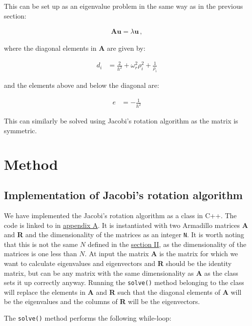 \documentclass[reprint,english,notitlepage]{revtex4-1}  %
\begin{document}
This can be set up as an eigenvalue problem in the same way as in the previous section:

\begin{align*}
\textbf{Au} = \lambda \textbf{u} \, ,
\end{align*}

where the diagonal elements in \textbf{A} are given by:

\begin{align*}
d_i &= \frac{2}{h^2} + \omega_r^2 \rho_i^2 + \frac{1}{\rho_i}
\end{align*}

and the elements above and below the diagonal are:

\begin{align*}
e &= - \frac{1}{h^2}
\end{align*}

This can similarly be solved using Jacobi's rotation algorithm as the matrix is symmetric.

\newpage


\section{Method} \label{sec:III}

\subsection{Implementation of Jacobi's rotation algorithm} \label{sec:III:a}

We have implemented the Jacobi's rotation algorithm as a class in C++. The code is linked to in \hyperref[A]{appendix A}. It is instantiated with two Armadillo \citep{Armadillo} matrices \textbf{A} and \textbf{R} and the dimensionality of the matrices as an integer \verb+N+. It is worth noting that this is not the same $N$ defined in the \hyperref[sec:II]{section II}, as the dimensionality of the matrices is one less than $N$. At input the matrix \textbf{A} is the matrix for which we want to calculate eigenvalues and eigenvectors and \textbf{R} should be the identity matrix, but can be any matrix with the same dimensionality as \textbf{A} as the class sets it up correctly anyway. Running the \verb+solve()+ method belonging to the class will replace the elements in \textbf{A} and \textbf{R} such that the diagonal elements of \textbf{A} will be the eigenvalues and the columns of \textbf{R} will be the eigenvectors.

The \verb+solve()+ method performs the following while-loop:
\end{document}
